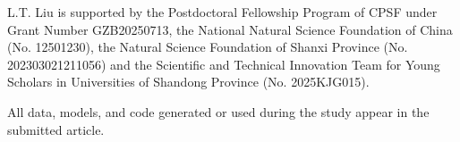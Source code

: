 \documentclass[reqno, 11pt]{amsart} %
\numberwithin{equation}{section}
\begin{document}
	L.T. Liu is supported by the Postdoctoral Fellowship Program of CPSF under Grant Number GZB20250713, the National Natural Science Foundation of China (No. 12501230), the Natural Science Foundation of Shanxi Province (No. 202303021211056) and the Scientific and Technical Innovation Team for Young Scholars in Universities of Shandong Province (No. 2025KJG015).
	
	
	
	
	
	
	All data, models, and code generated or used during the study appear in the submitted article.
	
	
	
	
	
	
	
	
	
	
	
	
	
	
	
	
	
	
	
	
	
\end{document}
